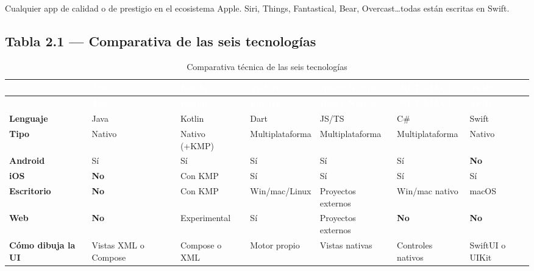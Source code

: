  Cualquier app de calidad o de prestigio en el ecosistema Apple. Siri, Things, Fantastical, Bear, Overcast\ldots todas están escritas en Swift.%
\subsection*{Tabla 2.1 --- Comparativa de las seis tecnologías}

{\footnotesize
\begin{xltabular}{\textwidth}{@{}>{\RaggedRight\arraybackslash}p{2.5cm} >{\RaggedRight\arraybackslash}X >{\RaggedRight\arraybackslash}X >{\RaggedRight\arraybackslash}X >{\RaggedRight\arraybackslash}X >{\RaggedRight\arraybackslash}X >{\RaggedRight\arraybackslash}X@{}}
\caption{Comparativa técnica de las seis tecnologías}\label{tab:tec-comparativa}\\
\toprule
{}
\textcolor{white}{\sffamily\bfseries} & \textcolor{white}{\sffamily\bfseries Java} & \textcolor{white}{\sffamily\bfseries Kotlin} & \textcolor{white}{\sffamily\bfseries Flutter} & \textcolor{white}{\sffamily\bfseries React Native} & \textcolor{white}{\sffamily\bfseries .NET MAUI} & \textcolor{white}{\sffamily\bfseries Swift} \\
\midrule
\endfirsthead
\toprule
{}
\textcolor{white}{\sffamily\bfseries} & \textcolor{white}{\sffamily\bfseries Java} & \textcolor{white}{\sffamily\bfseries Kotlin} & \textcolor{white}{\sffamily\bfseries Flutter} & \textcolor{white}{\sffamily\bfseries React Native} & \textcolor{white}{\sffamily\bfseries .NET MAUI} & \textcolor{white}{\sffamily\bfseries Swift} \\
\midrule
\endhead
\bottomrule
\endlastfoot
\textbf{Lenguaje} & Java & Kotlin & Dart & JS/TS & C\# & Swift \\
\textbf{Tipo} & Nativo & Nativo (+KMP) & Multiplataforma & Multiplataforma & Multiplataforma & Nativo \\
\textbf{Android} & Sí & Sí & Sí & Sí & Sí & \textbf{No} \\
\textbf{iOS} & \textbf{No} & Con KMP & Sí & Sí & Sí & Sí \\
\textbf{Escritorio} & \textbf{No} & Con KMP & Win/mac/Linux & Proyectos externos & Win/mac nativo & macOS \\
\textbf{Web} & \textbf{No} & Experimental & Sí & Proyectos externos & \textbf{No} & \textbf{No} \\
\textbf{Cómo dibuja la UI} & Vistas XML o Compose & Compose o XML & Motor propio & Vistas nativas & Controles nativos & SwiftUI o UIKit \\

\end{xltabular}}
